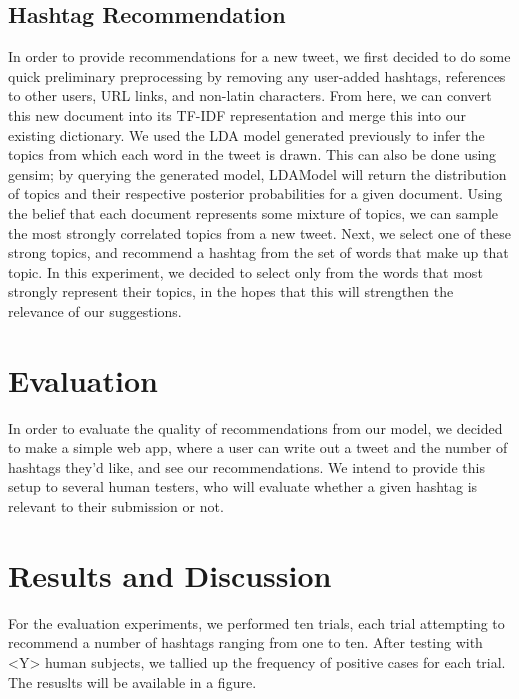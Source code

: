 \documentclass{acm_proc_article-sp}
\begin{document}
\subsection{Hashtag Recommendation}
\hspace*{5mm}In order to provide recommendations for a new tweet, we first decided to do some quick preliminary preprocessing by removing any user-added hashtags, references to other users, URL links, and non-latin characters. From here, we can convert this new document into its TF-IDF representation and merge this into our existing dictionary. We used the LDA model generated previously to infer the topics from which each word in the tweet is drawn. This can also be done using gensim; by querying the generated model, LDAModel will return the distribution of topics and their respective posterior probabilities for a given document. Using the belief that each document represents some mixture of topics, we can sample the most strongly correlated topics from a new tweet. Next, we select one of these strong topics, and recommend a hashtag from the set of words that make up that topic. In this experiment, we decided to select only from the words that most strongly represent their topics, in the hopes that this will strengthen the relevance of our suggestions.\\

\section{Evaluation}
\hspace*{5mm}In order to evaluate the quality of recommendations from our model, we decided to make a  simple web app, where a user can write out a tweet and the number of hashtags they'd like, and see our recommendations. We intend to provide this setup to several human testers, who will evaluate whether a given hashtag is relevant to their submission or not.\\

\section{Results and Discussion}
\hspace*{5mm}For the evaluation experiments, we performed ten trials, each trial attempting to recommend a number of hashtags ranging from one to ten. After testing with <Y> human subjects, we tallied up the frequency of positive cases for each trial. The resuslts will be available in a figure. \\
\end{document}

